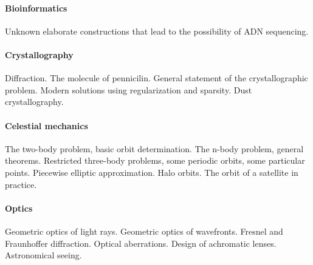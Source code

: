 \paragraph{Bioinformatics}
Unknown elaborate constructions that lead to the possibility of ADN
sequencing.

\paragraph{Crystallography}
Diffraction.  The molecule of pennicilin.  General statement of the
crystallographic problem.  Modern solutions using regularization and
sparsity.  Dust crystallography.

\paragraph{Celestial mechanics}
The two-body problem, basic orbit determination.  The n-body problem, general
theorems.  Restricted three-body problems, some periodic orbits, some
particular points.  Piecewise elliptic approximation.  Halo orbits.
The orbit of a satellite in practice.

\paragraph{Optics}
Geometric optics of light rays.
Geometric optics of wavefronts.
Fresnel and Fraunhoffer diffraction.
Optical aberrations.
Design of achromatic lenses.
Astronomical seeing.


